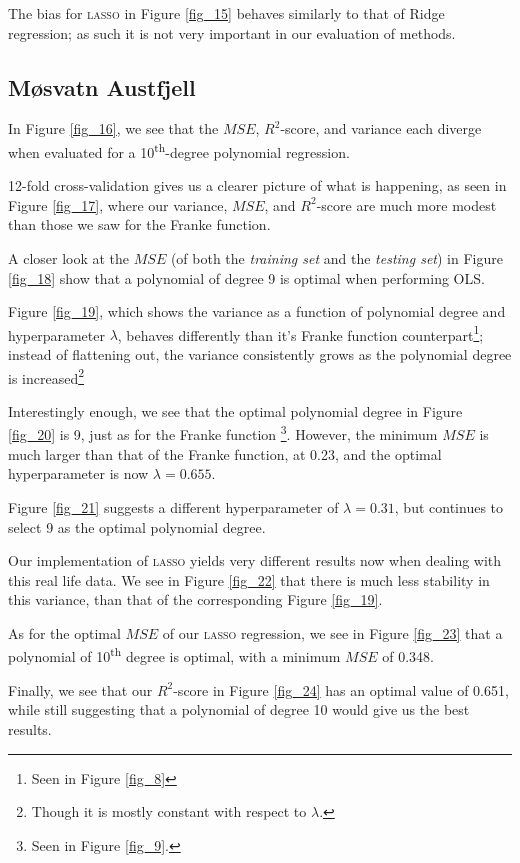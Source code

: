 \documentclass[a4paper,10pt,english]{article}
\begin{document}
The bias for \textsc{lasso} in Figure \ref{fig_15} behaves similarly to that of Ridge regression; as such it is not very important in our evaluation of methods.

\subsection*{Møsvatn Austfjell}

In Figure \ref{fig_16}, we see that the $MSE$, $R^2$-score, and variance each diverge when evaluated for a 10\textsuperscript{th}-degree polynomial regression.

12-fold cross-validation gives us a clearer picture of what is happening, as seen in Figure \ref{fig_17}, where our variance, $MSE$, and $R^2$-score are much more modest than those we saw for the Franke function.

A closer look at the $MSE$ (of both the \textit{training set} and the \textit{testing set}) in Figure \ref{fig_18} show that a polynomial of degree 9 is optimal when performing OLS.

Figure \ref{fig_19}, which shows the variance as a function of polynomial degree and hyperparameter $\lambda$, behaves differently than it's Franke function counterpart\footnote{Seen in Figure \ref{fig_8}}; instead of flattening out, the variance consistently grows as the polynomial degree is increased\footnote{Though it is mostly constant with respect to $\lambda$.}

Interestingly enough, we see that the optimal polynomial degree in Figure \ref{fig_20} is 9, just as for the Franke function \footnote{Seen in Figure \ref{fig_9}.}.  However, the minimum $MSE$ is much larger than that of the Franke function, at 0.23, and the optimal hyperparameter is now $\lambda = 0.655$.

Figure \ref{fig_21} suggests a different hyperparameter of $\lambda = 0.31$, but continues to select 9 as the optimal polynomial degree.

Our implementation of \textsc{lasso} yields very different results now when dealing with this real life data.  We see in Figure \ref{fig_22} that there is much less stability in this variance, than that of the corresponding Figure \ref{fig_19}.

As for the optimal $MSE$ of our \textsc{lasso} regression, we see in Figure \ref{fig_23} that a polynomial of 10\textsuperscript{th} degree is optimal, with a minimum $MSE$ of 0.348. 

Finally, we see that our $R^2$-score in Figure \ref{fig_24} has an optimal value of 0.651, while still suggesting that a polynomial of degree 10 would give us the best results.
\end{document}
